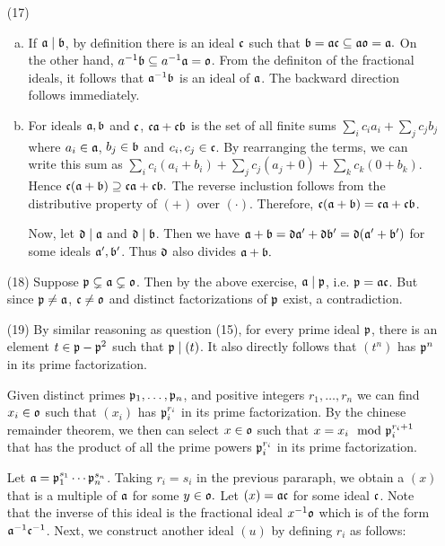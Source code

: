 \documentclass{article}
\theoremstyle{definition}
\theoremstyle{remark}
\begin{document}
\begin{enumerate}
  \item[(17)]
        \begin{enumerate}[(a)]
          \item If $\mathfrak{a} \mid \mathfrak{b}$, by definition there is an ideal $\mathfrak{c}$ such that $\mathfrak{b}  = \mathfrak{a} \mathfrak{c}  \subseteq \mathfrak{a}  \mathfrak{o} = \mathfrak{a}.$ On the other hand,  $\I \I a^{-1}\I b \subseteq a^{-1}\I a = \io$. From the definiton of the fractional ideals, it follows that $\mathfrak{a}^{-1}\mathfrak{b}$ is an ideal of $\mathfrak{a}$. The backward direction follows immediately.


          \item For  ideals $\mathfrak{a}, \mathfrak{b}$ and $\mathfrak{c}$, $\mathfrak{c}\mathfrak{a} + \mathfrak{c}\mathfrak{b}$ is the set of all finite sums $\sum_i c_ia_i + \sum_j c_jb_j$ where $a_i \in \mathfrak{a}$, $b_j \in \mathfrak{b}$ and $c_i, c_j \in \mathfrak{c}$. By rearranging the terms, we can write this sum as $\sum_i c_i(a_i + b_i)+ \sum_j c_j(a_j + 0)+ \sum_k c_k(0 + b_k)$. Hence $\mathfrak{c}(\mathfrak{a} + \mathfrak{b}) \supseteq \mathfrak{c}\mathfrak{a} + \mathfrak{c}\mathfrak{b}.$ The reverse inclustion follows from the distributive property of $(+)$ over $(\cdot)$. Therefore, $\mathfrak{c}(\mathfrak{a} + \mathfrak{b}) = \mathfrak{c}\mathfrak{a} + \mathfrak{c}\mathfrak{b}$.

                Now, let $\mathfrak{d} \mid \mathfrak{a}$ and $\mathfrak{d} \mid \mathfrak{b}$. Then we have $\mathfrak{a} + \mathfrak{b} = \mathfrak{d}\mathfrak{a}' + \mathfrak{d}\mathfrak{b}' = \mathfrak{d}(\mathfrak{a}' + \mathfrak{b}')$ for some ideals $\mathfrak{a}', \mathfrak{b}'$. Thus $\mathfrak{d}$ also divides $\mathfrak{a} + \mathfrak{b}.$
        \end{enumerate}

  \item[(18)] Suppose $\mathfrak{p} \subsetneq \mathfrak{a} \subsetneq \mathfrak{o}$. Then by the above exercise, $\mathfrak{a} \mid \mathfrak{p}$, i.e. $\mathfrak{p} = \mathfrak{a}\mathfrak{c}$. But since $\mathfrak{p} \neq \mathfrak{a}$, $\mathfrak{c} \neq \mathfrak{o}$ and distinct factorizations of $\mathfrak{p}$ exist, a contradiction.

  \item[(19)]
        By similar reasoning as question (15), for every prime ideal $\mathfrak{p}$, there is an element $t \in \mathfrak{p} - \mathfrak{p}^2$ such that $\mathfrak{p} \mid (t)$. It also directly follows that $(t^n)$ has $\mathfrak{p}^n$ in its prime factorization.

        Given distinct primes $\mathfrak{p}_1, \dots, \mathfrak{p}_n$, and positive integers $r_1, \dots, r_n$ we can find $x_i \in \mathfrak{o}$ such that $(x_i)$ has $\mathfrak{p}_i^{r_i}$ in its prime factorization. By the chinese remainder theorem, we then can select $x \in  \mathfrak{o}$ such that $x = x_i \mod {\mathfrak{p}}_i^{r_i + 1}$ that has the product of all the prime powers $\mathfrak{p}_i^{r_i}$ in its prime factorization.

        Let $\mathfrak{a} = \mathfrak{p}_1^{s_1}\cdots \mathfrak{p}_n^{s_n}$. Taking $r_i = s_i$ in the previous pararaph, we obtain a $(x)$ that is a multiple of $\mathfrak{a}$ for some $y \in \mathfrak{o}.$ Let $(x) = \mathfrak{a} \mathfrak{c}$ for some ideal $\mathfrak{c}$. Note that the inverse of this ideal is the fractional ideal $x^{-1}\mathfrak{o}$ which is of the form $\mathfrak{a}^{-1} \mathfrak{c}^{-1}$. Next, we construct another ideal $(u)$ by defining $r_i$ as follows:


\end{enumerate}
\end{document}
